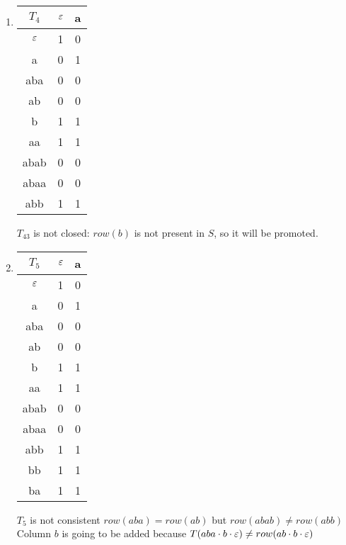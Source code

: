 \begin{enumerate}
  \item \begin{minipage}{0.3\textwidth}
          \begin{tabular}{c||c|c}
            $T_4$ & $\varepsilon$ & a \\
            \hline\hline
            $\varepsilon$  & 1    & 0 \\
            a     & 0    & 1 \\
            aba   & 0    & 0 \\
            ab    & 0    & 0 \\
            \hline\hline
            b     & 1    & 1 \\
            aa    & 1    & 1 \\
            abab  & 0    & 0 \\
            abaa  & 0    & 0 \\
            abb   & 1    & 1 \\
          \end{tabular}
        \end{minipage} \quad
        \begin{minipage}{0.5\textwidth}
          $T_43$ is not closed: $row(b)$ is not present in $S$, so it will be promoted.
        \end{minipage}

  \item \begin{minipage}{0.3\textwidth}
          \begin{tabular}{c||c|c}
            $T_5$ & $\varepsilon$ & a \\
            \hline\hline
            $\varepsilon$  & 1    & 0 \\
            a     & 0    & 1 \\
            aba   & 0    & 0 \\
            ab    & 0    & 0 \\
            b     & 1    & 1 \\
            \hline\hline
            aa    & 1    & 1 \\
            abab  & 0    & 0 \\
            abaa  & 0    & 0 \\
            abb   & 1    & 1 \\
            bb    & 1    & 1 \\
            ba    & 1    & 1 \\
          \end{tabular}
        \end{minipage} \quad
        \begin{minipage}{0.5\textwidth}
          $T_5$ is not consistent $row(aba) = row(ab)$ but $row(abab) \neq row(abb)$
          Column $b$ is going to be added because $T(aba \cdot b \cdot \varepsilon) \neq row(ab \cdot b \cdot \varepsilon)$
        \end{minipage}


\end{enumerate}

